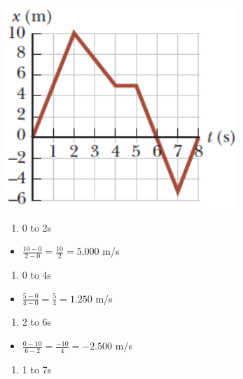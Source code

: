 \documentclass[
  letterpaper,
  DIV=11,
  numbers=noendperiod]{scrartcl}
\providecommand{\tightlist}{%
  \setlength{\itemsep}{0pt}\setlength{\parskip}{0pt}}\usepackage{longtable,booktabs,array}
\begin{document}
\includegraphics{img/Kinematics Velocity and Position HW/problem1.png}

\begin{enumerate}
\def\labelenumi{(\alph{enumi})}
\tightlist
\item
  0 to 2s
\end{enumerate}

\begin{itemize}
\tightlist
\item
  \(\frac{10-0}{2-0} = \frac{10}{2} = 5.000\) m/s
\end{itemize}

\begin{enumerate}
\def\labelenumi{(\alph{enumi})}
\setcounter{enumi}{1}
\tightlist
\item
  0 to 4s
\end{enumerate}

\begin{itemize}
\tightlist
\item
  \(\frac{5-0}{4-0}=\frac{5}{4}=1.250\) m/s
\end{itemize}

\begin{enumerate}
\def\labelenumi{(\alph{enumi})}
\setcounter{enumi}{2}
\tightlist
\item
  2 to 6s
\end{enumerate}

\begin{itemize}
\tightlist
\item
  \(\frac{0-10}{6-2}=\frac{-10}{4}=-2.500\) m/s
\end{itemize}

\begin{enumerate}
\def\labelenumi{(\alph{enumi})}
\setcounter{enumi}{3}
\tightlist
\item
  1 to 7s
\end{enumerate}
\end{document}
